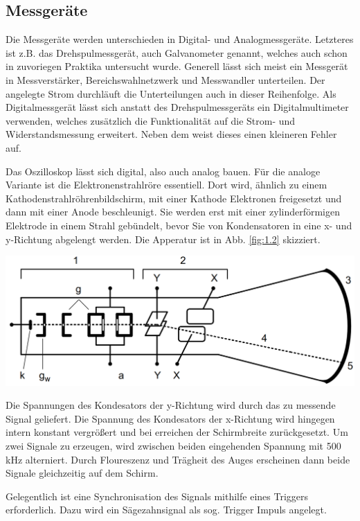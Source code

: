 \documentclass[10pt]{article}
\newenvironment{Figure}
  {\par\medskip\noindent\minipage{\linewidth}}
  {\endminipage\par\medskip}
\begin{document}
\begin{multicols}{2}
	\subsection{Messgeräte}
	Die Messgeräte werden unterschieden in Digital- und Analogmessgeräte. Letzteres ist z.B. das Drehspulmessgerät, auch Galvanometer genannt, welches auch schon in zuvoriegen Praktika untersucht wurde. Generell lässt sich meist ein Messgerät in Messverstärker, Bereichswahlnetzwerk und Messwandler unterteilen. Der angelegte Strom durchläuft die Unterteilungen auch in dieser Reihenfolge. Als Digitalmessgerät lässt sich anstatt des Drehspulmessgeräts ein Digitalmultimeter verwenden, welches zusätzlich die Funktionalität auf die Strom- und Widerstandsmessung erweitert. Neben dem weist dieses einen kleineren Fehler auf.

	Das Oszilloskop lässt sich digital, also auch analog bauen. Für die analoge Variante ist die Elektronenstrahlröre essentiell. Dort wird, ähnlich zu einem Kathodenstrahlröhrenbildschirm, mit einer Kathode Elektronen freigesetzt und dann mit einer Anode beschleunigt. Sie werden erst mit einer zylinderförmigen Elektrode in einem Strahl gebündelt, bevor Sie von Kondensatoren in eine x- und y-Richtung abgelengt werden. Die Apperatur ist in Abb. \ref{fig:1.2} skizziert.

	\begin{Figure}
		\centering
		\includegraphics[width=0.9\linewidth]{Osziloskop.png}
		\label{fig:1.2}
	\end{Figure}

	Die Spannungen des Kondesators der y-Richtung wird durch das zu messende Signal geliefert. Die Spannung des Kondesators der x-Richtung wird hingegen intern konstant vergrößert und bei erreichen der Schirmbreite zurückgesetzt. Um zwei Signale zu erzeugen, wird zwischen beiden eingehenden Spannung mit 500 kHz alterniert. Durch Floureszenz und Trägheit des Auges erscheinen dann beide Signale gleichzeitig auf dem Schirm.

	Gelegentlich ist eine Synchronisation des Signals mithilfe eines Triggers erforderlich. Dazu wird ein Sägezahnsignal als sog. Trigger Impuls angelegt.


\end{multicols}
\end{document}
